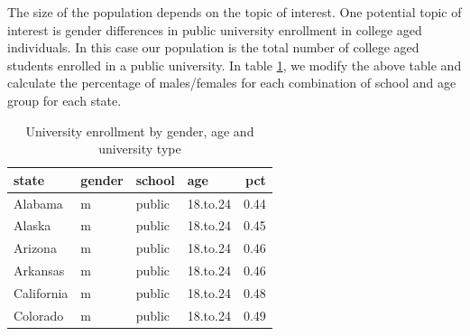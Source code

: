 \documentclass{article}\usepackage[]{graphicx}\usepackage[]{color}
\begin{document}
The size of the population depends on the topic of interest.  One potential topic of interest is gender differences in public university enrollment in college aged individuals.  In this case our population is the total number of college aged students enrolled in a public university.  In table \ref{tab:freq2}, we modify the above table and calculate the percentage of males/females for each combination of school and age group for each state.\\
\begin{table}[ht]
\centering
\begin{tabular}{llllr}
  \hline
state & gender & school & age & pct \\ 
  \hline
Alabama & m & public & 18.to.24 & 0.44 \\ 
  Alaska & m & public & 18.to.24 & 0.45 \\ 
  Arizona & m & public & 18.to.24 & 0.46 \\ 
  Arkansas & m & public & 18.to.24 & 0.46 \\ 
  California & m & public & 18.to.24 & 0.48 \\ 
  Colorado & m & public & 18.to.24 & 0.49 \\ 
   \hline
\end{tabular}
\caption{University enrollment by gender, age and university type} 
\label{tab:freq2}
\end{table}
\end{document}

